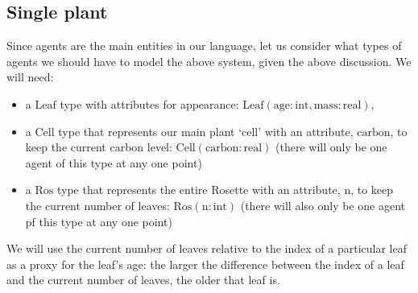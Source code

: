 \subsection{Single plant}
Since agents are the main entities in our language, let us
consider what types of agents we should have to model the above
system, given the above discussion. We will need:
\begin{itemize}
\item a $\mathrm{Leaf}$ type with attributes for 
appearance: $\mathrm{Leaf}(\mathrm{age}:\mathrm{int},
\mathrm{mass}:\mathrm{real})$,
\item a $\mathrm{Cell}$ type that represents our main plant `cell' with an
attribute, $\mathrm{carbon}$, to keep the current carbon level:
$\mathrm{Cell}(\mathrm{carbon}:\mathrm{real})$ (there will only be one agent of
this type at any one point)
\item a $\mathrm{Ros}$ type that represents the entire Rosette with an
attribute, $\mathrm{n}$, to keep the current number of leaves:
$\mathrm{Ros}(\mathrm{n}:\mathrm{int})$ (there will also only be one agent pf
this type at any one point)
\end{itemize}
We will use the current number of leaves relative to the index of
a particular leaf as a proxy for the leaf's age: the larger the difference
between the index of a leaf and the current number of leaves, the older that
leaf is.

